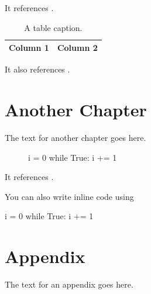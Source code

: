 \documentclass[a4paper]{phdthesis}
\begin{document}
It references .

\begin{table}
  \center
  \caption{A table caption.\label{tab:1}}
  \begin{tabular}{cc}
    \toprule
    Column 1 & Column 2\\
    \bottomrule
  \end{tabular}
\end{table}

It also references .

\chapter{Another Chapter}
The text for another chapter goes here.

\begin{figure}
  \begin{algorithm}[caption={An algorithm caption.}, label=alg:1]
    i = 0
    while True:
      i += 1
  \end{algorithm}
\end{figure}

It references .

You can also write inline code using

\begin{python}
i = 0
while True:
  i += 1
\end{python}

\appendix
\chapter{Appendix}
The text for an appendix goes here.

\backmatter
%
%
\end{document}
